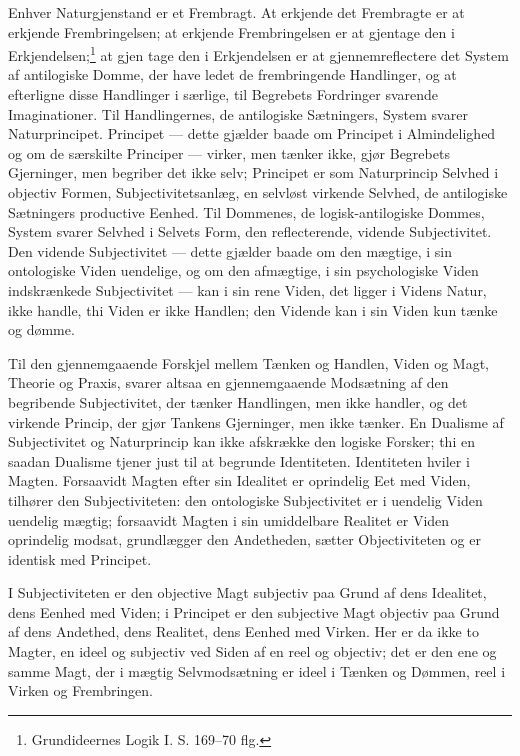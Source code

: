 \documentclass[12pt]{book}
\newcommand{\opage}[1]{\marginnote{\footnotesize\textit{[#1]}}}
\begin{document}
Enhver Naturgjenstand er et Frembragt. At erkjende
det Frembragte er at erkjende Frembringelsen; at erkjende
Frembringelsen er at gjentage den i Erkjendelsen;\footnote{Grundideernes Logik I. S. 169--70 flg.} %
at gjen%
\opage{142}tage den i Erkjendelsen er at gjennemreflectere det System af
antilogiske Domme, der have ledet de frembringende Handlinger,
og at efterligne disse Handlinger i særlige, til Begrebets
Fordringer svarende Imaginationer. Til Handlingernes,
de antilogiske Sætningers, System svarer Naturprincipet.
Principet --- dette gjælder baade om Principet i Almindelighed
og om de særskilte Principer --- virker, men tænker ikke, gjør
Begrebets Gjerninger, men begriber det ikke selv; Principet
er som Naturprincip Selvhed i objectiv Formen, Subjectivitetsanlæg,
en selvløst virkende Selvhed, de antilogiske Sætningers
productive Eenhed. Til Dommenes, de logisk-antilogiske
Dommes, System svarer Selvhed i Selvets Form,
den reflecterende, vidende Subjectivitet. Den vidende Subjectivitet
--- dette gjælder baade om den mægtige, i sin ontologiske
Viden uendelige, og om den afmægtige, i sin psychologiske
Viden indskrænkede Subjectivitet --- kan i sin rene
Viden, det ligger i Videns Natur, ikke handle, thi Viden er
ikke Handlen; den Vidende kan i sin Viden kun tænke og
dømme.

Til den gjennemgaaende Forskjel mellem Tænken og
Handlen, Viden og Magt, Theorie og Praxis, svarer altsaa
en gjennemgaaende Modsætning af den begribende Subjectivitet,
der tænker Handlingen, men ikke handler, og det virkende
Princip, der gjør Tankens Gjerninger, men ikke tænker.
En Dualisme af Subjectivitet og Naturprincip kan ikke afskrække
den logiske Forsker; thi en saadan Dualisme tjener
just til at begrunde Identiteten. Identiteten hviler i Magten.
Forsaavidt Magten efter sin Idealitet er oprindelig Eet med
Viden, tilhører den Subjectiviteten: den ontologiske Subjectivitet
er i uendelig Viden uendelig mægtig; forsaavidt Magten
i sin umiddelbare Realitet er Viden oprindelig modsat, grundlægger
den Andetheden, sætter Objectiviteten og er identisk
med Principet.

I Subjectiviteten er den objective Magt subjectiv paa
\opage{143}Grund af dens Idealitet, dens Eenhed med Viden; i Principet
er den subjective Magt objectiv paa Grund af dens
Andethed, dens Realitet, dens Eenhed med Virken. Her er
da ikke to Magter, en ideel og subjectiv ved Siden af en
reel og objectiv; det er den ene og samme Magt, der i mægtig
Selvmodsætning er ideel i Tænken og Dømmen, reel i Virken
og Frembringen.
\end{document}
